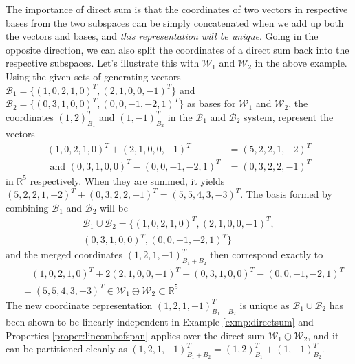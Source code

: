 The importance of direct sum is that the coordinates of two vectors in respective bases from the two subspaces can be simply concatenated when we add up both the vectors and bases, and \textit{this representation will be unique}. Going in the opposite direction, we can also split the coordinates of a direct sum back into the respective subspaces. Let's illustrate this with $\mathcal{W}_1$ and $\mathcal{W}_2$ in the above example. Using the given sets of generating vectors $\mathcal{B}_1 = \{(1,0,2,1,0)^T, (2,1,0,0,-1)^T\}$ and $\mathcal{B}_2 = \{(0,3,1,0,0)^T, (0,0,-1,-2,1)^T\}$ as bases for $\mathcal{W}_1$ and $\mathcal{W}_2$, the coordinates $(1,2)_{B_1}^T$ and $(1,-1)_{B_2}^T$ in the $\mathcal{B}_1$ and $\mathcal{B}_2$ system, represent the vectors 
\begin{align*}
(1,0,2,1,0)^T + (2,1,0,0,-1)^T &= (5,2,2,1,-2)^T \\
\text{ and } (0,3,1,0,0)^T - (0,0,-1,-2,1)^T &= (0,3,2,2,-1)^T
\end{align*}
in $\mathbb{R}^5$ respectively. When they are summed, it yields $(5,2,2,1,-2)^T + (0,3,2,2,-1)^T = (5,5,4,3,-3)^T$. The basis formed by combining $\mathcal{B}_1$ and $\mathcal{B}_2$ will be
\begin{align*}
\mathcal{B}_1 \cup \mathcal{B}_2 = \{(1,0,2,1,0)^T, (2,1,0,0,-1)^T, \\ (0,3,1,0,0)^T,  (0,0,-1,-2,1)^T\}
\end{align*}
and the merged coordinates $(1,2,1,-1)_{B_1+B_2}^T$ then correspond exactly to
\begin{align*}
&\quad (1,0,2,1,0)^T + 2(2,1,0,0,-1)^T + (0,3,1,0,0)^T - (0,0,-1,-2,1)^T \\
&= (5,5,4,3,-3)^T \in \mathcal{W}_1 \oplus \mathcal{W}_2 \subset \mathbb{R}^5
\end{align*}
The new coordinate representation $(1,2,1,-1)_{B_1+B_2}^T$ is unique as $\mathcal{B}_1 \cup \mathcal{B}_2$ has been shown to be linearly independent in Example \ref{exmp:directsum} and Properties \ref{proper:lincombofspan} applies over the direct sum $\mathcal{W}_1 \oplus \mathcal{W}_2$, and it can be partitioned cleanly as $(1,2,1,-1)_{B_1+B_2}^T = (1,2)_{B_1}^T + (1,-1)_{B_2}^T$.

